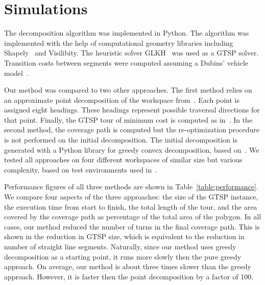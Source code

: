 \documentclass[../main.tex]{subfiles}
\begin{document}
\section{Simulations}
\label{section:single_agent_simulation}
The decomposition algorithm was implemented in Python. The algorithm was implemented with the help of computational geometry libraries including Shapely~\cite{Shapely:13} and Visilibity\cite{VisiLibity:08}. The heuristic solver GLKH~\cite{helsgaun2000effective} was used as a GTSP solver. Transition costs between segments were computed assuming a Dubins' vehicle model~\cite{dubins1957curves}.

Our method was compared to two other approaches. The first method relies on an approximate point decomposition of the workspace from~\cite{arkin2000approximation}. Each point is assigned eight headings. These headings represent possible traversal directions for that point. Finally, the GTSP tour of minimum cost is computed as in~\cite{le2012dubins}. In the second method, the coverage path is computed but the re-optimization procedure is not performed on the initial decomposition. The initial decomposition is generated with a Python library for greedy convex decomposition, based on~\cite{fernandez2008practical}. We tested all approaches on four different workspaces of similar size but various complexity, based on test environments used in~\cite{choi2009online}.

Performance figures of all three methods are shown in Table~\ref{table:performance}. We compare four aspects of the three approaches: the size of the GTSP instance, the execution time from start to finish, the total length of the tour, and the area covered by the coverage path as percentage of the total area of the polygon. In all cases, our method reduced the number of turns in the final coverage path. This is shown in the reduction in GTSP size, which is equivalent to the reduction in number of straight line segments. Naturally, since our method uses greedy decomposition as a starting point, it runs more slowly then the pure greedy approach. On average, our method is about three times slower than the greedy approach. However, it is faster then the point decomposition by a factor of 100. 
\end{document}
